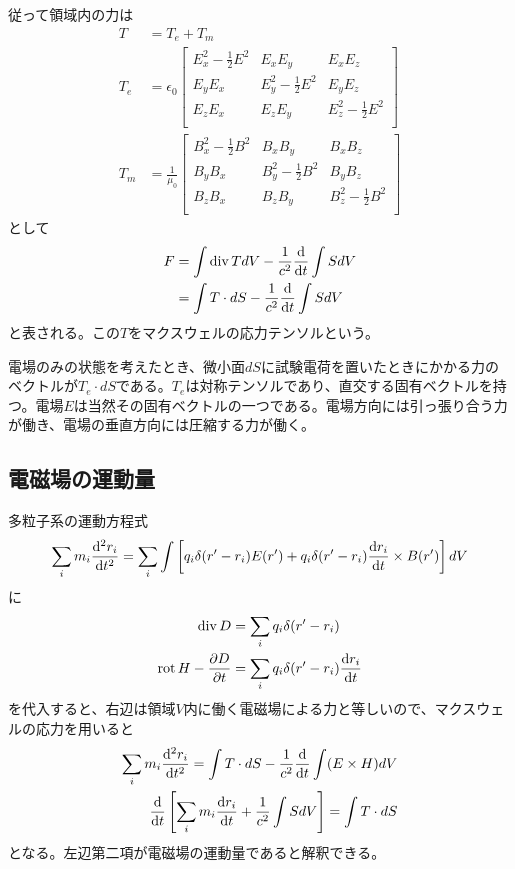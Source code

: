     従って領域内の力は
    \begin{align*}
        T &= T_e + T_m\\
        T_e &= \epsilon_0
        \begin{bmatrix}
            E_x^2 - \frac{1}{2}E^2 & E_xE_y & E_xE_z\\
            E_yE_x & E_y^2 - \frac{1}{2}E^2 & E_yE_z\\
            E_zE_x & E_zE_y & E_z^2 - \frac{1}{2}E^2\\
        \end{bmatrix}\\
        T_m &= \frac{1}{\mu_0}
        \begin{bmatrix}
            B_x^2 - \frac{1}{2}B^2 & B_xB_y & B_xB_z\\
            B_yB_x & B_y^2 - \frac{1}{2}B^2 & B_yB_z\\
            B_zB_x & B_zB_y & B_z^2 - \frac{1}{2}B^2\\
        \end{bmatrix}
    \end{align*}
    として
    \begin{align*}
        F   &= \int \div T dV - \frac{1}{c^2}\dv{t}\int S dV\\
            &= \int T \cdot dS - \frac{1}{c^2}\dv{t}\int S dV
    \end{align*}
    と表される。この$T$をマクスウェルの応力テンソルという。

    電場のみの状態を考えたとき、微小面$dS$に試験電荷を置いたときにかかる力のベクトルが$T_e \cdot dS$である。$T_e$は対称テンソルであり、直交する固有ベクトルを持つ。電場$E$は当然その固有ベクトルの一つである。電場方向には引っ張り合う力が働き、電場の垂直方向には圧縮する力が働く。

\subsection{電磁場の運動量}
    多粒子系の運動方程式
        \[\sum_i m_i\dv[2]{r_i}{t} = \sum_i \int \left[q_i\delta(r' - r_i)E(r') + q_i\delta(r' - r_i)\dv{r_i}{t} \times B(r')\right] dV\]
    に
    \begin{align*}
        \div D &= \sum_i q_i\delta(r' - r_i)\\
        \rot H - \pd[D]{t} &= \sum_i q_i\delta(r' - r_i)\dv{r_i}{t}\\
    \end{align*}
    を代入すると、右辺は領域$V$内に働く電磁場による力と等しいので、マクスウェルの応力を用いると
    \begin{align*}
        \sum_i m_i\dv[2]{r_i}{t} = \int T \cdot dS - \frac{1}{c^2}\dv{t}\int (E \times H) dV\\
        \dv{t}\left[\sum_i m_i\dv{r_i}{t} + \frac{1}{c^2}\int S dV\right] = \int T \cdot dS
    \end{align*}
    となる。左辺第二項が電磁場の運動量であると解釈できる。

